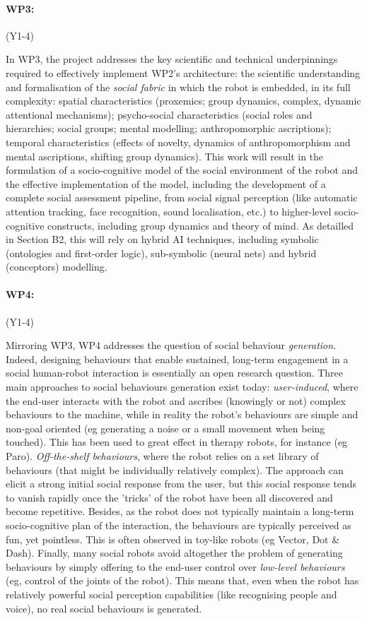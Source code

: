 \documentclass[11pt]{report}
\begin{document}
\paragraph{WP3: \textbf{\wpThree}} (Y1-4)

In WP3, the project addresses the key scientific and technical underpinnings
required to effectively implement WP2's architecture:  the scientific
understanding and formalisation of the \emph{social fabric} in which the robot
is embedded, in its full complexity: spatial characteristics (proxemics; group
dynamics, complex, dynamic attentional mechanisms); psycho-social
characteristics (social roles and hierarchies; social groups; mental modelling;
anthropomorphic ascriptions); temporal characteristics (effects of novelty,
dynamics of anthropomorphism and mental ascriptions, shifting group dynamics).
This work will result in the formulation of a socio-cognitive model of the
social environment of the robot and the effective implementation of the model,
including the development of a complete social assessment pipeline, from social
signal perception (like automatic attention tracking, face recognition, sound
localisation, etc.) to higher-level socio-cognitive constructs, including group
dynamics and theory of mind. As detailled in Section B2, this will rely on
hybrid AI techniques, including symbolic (ontologies and first-order logic),
sub-symbolic (neural nets) and hybrid (conceptors) modelling.

\paragraph{WP4: \textbf{\wpFour}} (Y1-4)

Mirroring WP3, WP4 addresses the question of social behaviour \emph{generation}.
Indeed, designing behaviours that enable sustained, long-term engagement in a
social human-robot interaction is essentially an open research question. Three
main approaches to social behaviours generation exist today:
\emph{user-induced}, where the end-user interacts with the robot and ascribes
(knowingly or not) complex behaviours to the machine, while in reality the
robot's behaviours are simple and non-goal oriented (eg generating a noise or a
small movement when being touched). This has been used to great effect in
therapy robots, for instance (eg Paro). \emph{Off-the-shelf behaviours}, where
the robot relies on a set library of behaviours (that might be individually
relatively complex). The approach can elicit a strong initial social response
from the user, but this social response tends to vanish rapidly once the
'tricks' of the robot have been all discovered and become repetitive.  Besides,
as the robot does not typically maintain a long-term socio-cognitive plan of the
interaction, the behaviours are typically perceived as fun, yet pointless. This
is often observed in toy-like robots (eg Vector, Dot \& Dash). Finally, many
social robots avoid altogether the problem of generating behaviours by simply
offering to the end-user control over \emph{low-level behaviours} (eg, control
of the joints of the robot). This means that, even when the robot has relatively
powerful social perception capabilities (like recognising people and voice), no
real social behaviours is generated.
\end{document}
